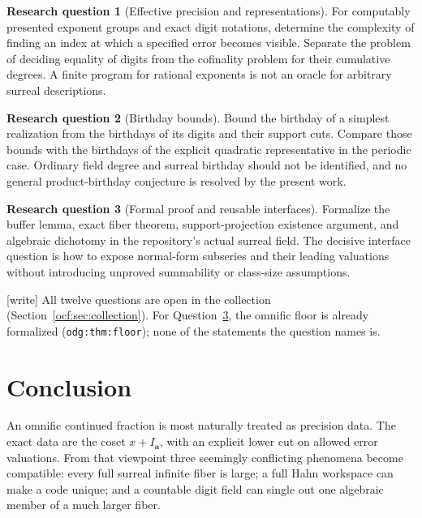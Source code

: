 \documentclass[11pt,a4paper]{article}
\numberwithin{equation}{section}
\theoremstyle{definition}
\newtheorem{problem}{Research question}
\theoremstyle{remark}
\newcommand{\codea}{\boldsymbol a}
\newcommand{\lbl}[1]{\nolinkurl{#1}}%
\newcommand{\wtag}{\textup{[write]}}%
\begin{document}
\begin{problem}[Effective precision and representations]\label{ocf:q:effective}
For computably presented exponent groups and exact digit notations,
determine the complexity of finding an index at which a specified error
becomes visible. Separate the problem of deciding equality of digits from
the cofinality problem for their cumulative degrees. A finite program for
rational exponents is not an oracle for arbitrary surreal descriptions.
\end{problem}

\begin{problem}[Birthday bounds]\label{ocf:q:birthday}
Bound the birthday of a simplest realization from the birthdays of its
digits and their support cuts. Compare those bounds with the birthdays
of the explicit quadratic representative in the periodic case. Ordinary
field degree and surreal birthday should not be identified, and no
general product-birthday conjecture is resolved by the present work.
\end{problem}

\begin{problem}[Formal proof and reusable interfaces]\label{ocf:q:formal}
Formalize the buffer lemma, exact fiber theorem, support-projection
existence argument, and algebraic dichotomy in the repository's actual
surreal field. The decisive interface question is how to expose
normal-form subseries and their leading valuations without introducing
unproved summability or class-size assumptions.
\end{problem}

\wtag{} All twelve questions are open in the collection
(Section~\ref{ocf:sec:collection}). For Question~\ref{ocf:q:formal}, the
omnific floor is already formalized (\lbl{odg:thm:floor}); none of the
statements the question names is.

\section{Conclusion}\label{ocf:sec:conclusion}

An omnific continued fraction is most naturally treated as precision data.
The exact data are the coset $x+I_{\codea}$, with an explicit lower cut on
allowed error valuations. From that viewpoint three seemingly conflicting
phenomena become compatible: every full surreal infinite fiber is large;
a full Hahn workspace can make a code unique; and a countable digit field
can single out one algebraic member of a much larger fiber.
\end{document}
